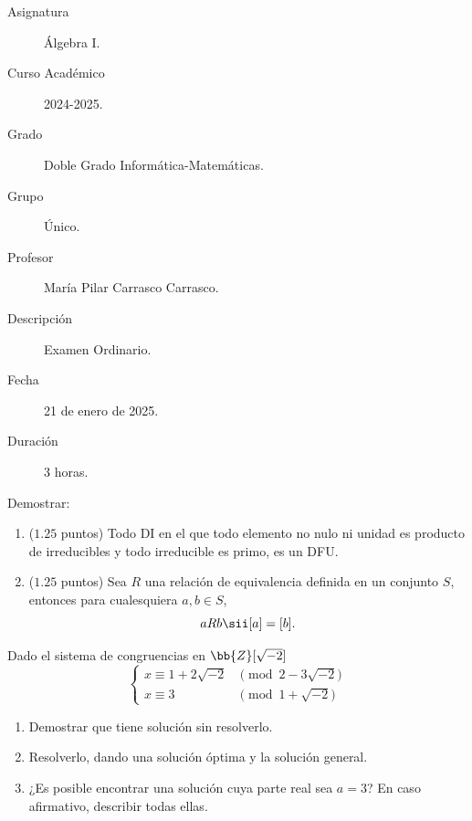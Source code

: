 \documentclass[12pt]{article}
\begin{document}

    
    

    \begin{description}
        \item[Asignatura] Álgebra I.
        \item[Curso Académico] 2024-2025.
        \item[Grado] Doble Grado Informática-Matemáticas.
        \item[Grupo] Único.
        \item[Profesor] María Pilar Carrasco Carrasco.
        \item[Descripción] Examen Ordinario.
        \item[Fecha] 21 de enero de 2025.
        \item[Duración] 3 horas.
    
    \end{description}
    \newpage


    
    \begin{ejercicio}[$2.5$ puntos]
        Demostrar:
        \begin{enumerate}[label=\arabic*.]
            \item ($1.25$ puntos) Todo DI en el que todo elemento no nulo ni unidad es producto de irreducibles y todo irreducible es primo, es un DFU.
            \item ($1.25$ puntos) Sea $R$ una relación de equivalencia definida en un conjunto $S$, entonces para cualesquiera $a, b \in S$,
            \[
            aRb \sii [a] = [b].
            \]
        \end{enumerate}
    \end{ejercicio}

    \begin{ejercicio}[$2.5$ puntos]
        Dado el sistema de congruencias en $\bb{Z}[\sqrt{-2}]$
        \[
        \begin{cases}
            x \equiv 1+2\sqrt{-2} & \pmod{2-3\sqrt{-2}} \\
            x \equiv 3 & \pmod{1+\sqrt{-2}}
        \end{cases}
        \]
        \begin{enumerate}
            \item Demostrar que tiene solución sin resolverlo.
        
            \item Resolverlo, dando una solución óptima y la solución general.
        
            \item ¿Es posible encontrar una solución cuya parte real sea $a = 3$? En caso afirmativo, describir todas ellas.
        \end{enumerate}
    \end{ejercicio}
\end{document}
